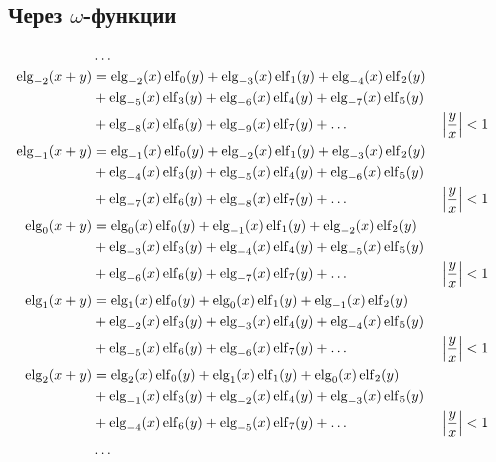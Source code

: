 
\subsection{Через $\omega$-функции}

\begin{equation*} \begin{aligned}
&\ldots \\
%
\elg_{-2}(x + y) &=   
  \elg_{-2}(x) \elf_0(y)
+ \elg_{-3}(x) \elf_1(y)  
+ \elg_{-4}(x) \elf_2(y) \\ &
+ \elg_{-5}(x) \elf_3(y)
+ \elg_{-6}(x) \elf_4(y)
+ \elg_{-7}(x) \elf_5(y) \\ &
+ \elg_{-8}(x) \elf_6(y)
+ \elg_{-9}(x) \elf_7(y)
+ \ldots & 
&\left| \frac{y}{x} \right| < 1 \\
%
\elg_{-1}(x + y) &=
  \elg_{-1}(x) \elf_0(y)
+ \elg_{-2}(x) \elf_1(y)  
+ \elg_{-3}(x) \elf_2(y) \\ &
+ \elg_{-4}(x) \elf_3(y)
+ \elg_{-5}(x) \elf_4(y)
+ \elg_{-6}(x) \elf_5(y) \\ &
+ \elg_{-7}(x) \elf_6(y)
+ \elg_{-8}(x) \elf_7(y)
+ \ldots & 
&\left| \frac{y}{x} \right| < 1 \\
%
\elg_0(x + y) &=
  \elg_0(x) \elf_0(y)
+ \elg_{-1}(x) \elf_1(y)  
+ \elg_{-2}(x) \elf_2(y) \\ &
+ \elg_{-3}(x) \elf_3(y)
+ \elg_{-4}(x) \elf_4(y)
+ \elg_{-5}(x) \elf_5(y) \\ &
+ \elg_{-6}(x) \elf_6(y)
+ \elg_{-7}(x) \elf_7(y)
+ \ldots & 
&\left| \frac{y}{x} \right| < 1 \\
%
\elg_1(x + y) &=
  \elg_1(x) \elf_0(y)
+ \elg_0(x) \elf_1(y)
+ \elg_{-1}(x) \elf_2(y) \\ &
+ \elg_{-2}(x) \elf_3(y)
+ \elg_{-3}(x) \elf_4(y)
+ \elg_{-4}(x) \elf_5(y) \\ &
+ \elg_{-5}(x) \elf_6(y)
+ \elg_{-6}(x) \elf_7(y)
+ \ldots & 
&\left| \frac{y}{x} \right| < 1 \\
%
\elg_2(x + y) &=
  \elg_2(x) \elf_0(y)
+ \elg_1(x) \elf_1(y)
+ \elg_0(x) \elf_2(y) \\ &
+ \elg_{-1}(x) \elf_3(y)
+ \elg_{-2}(x) \elf_4(y)
+ \elg_{-3}(x) \elf_5(y) \\ &
+ \elg_{-4}(x) \elf_6(y)
+ \elg_{-5}(x) \elf_7(y)
+ \ldots & 
&\left| \frac{y}{x} \right| < 1 \\
%
&\ldots \\
\end{aligned} \end{equation*}

